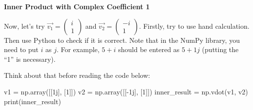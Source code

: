 \documentclass[a4paper, 10pt]{article}
\begin{document}
\begin{problem}
\textbf{Inner Product with Complex Coefficient 1}
\par Now, let's try \( \vec{v_1} = \begin{pmatrix} i \\ 1 \end{pmatrix} \) and \( \vec{v_2} = \begin{pmatrix} -i \\ 1 \end{pmatrix} \).
Firstly, try to use hand calculation. Then use Python to check if it is correct.
Note that in the NumPy library, you need to put \( i \) as \( j \).
For example, \( 5 + i \) should be entered as \( 5 + 1j \) (putting the ``1'' is necessary).

Think about that before reading the code below:

\begin{codingbox}
v1 = np.array([[1j], [1]])
v2 = np.array([[-1j], [1]])
inner_result = np.vdot(v1, v2)
print(inner_result)
\end{codingbox}

\end{problem}
\end{document}

